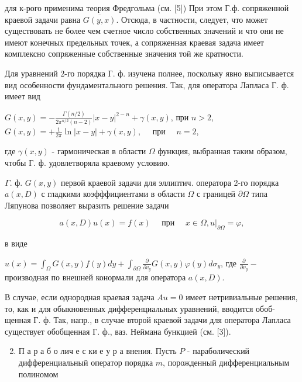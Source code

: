 \documentclass[10pt]{article}
\begin{document}
для к-рого применима теория Фредгольма (см. [5]) При этом Г.ф. сопряженной краевой задачи равна $\overline{G(y, x)}$. Отсюда, в частности, следует, что может существовать не более чем счетное число собственных значений и что они не имеют конечных предельных точек, а сопряженная краевая задача имеет комплексно сопряженные собственные значения той же кратности.



Для уравнений 2-го порядка Г. ф. изучена полнее, поскольку явно выписывается вид особенности фундаментального решения. Так, для оператора Лапласа Г. ф. имеет вид



$G(x, y)=-\frac{\Gamma(n / 2)}{2 \pi^{n / 2}(n-2)}|x-y|^{2-n}+\gamma(x, y)$, при $n>2$, $G(x, y)=+\frac{1}{2 \pi} \ln |x-y|+\gamma(x, y), \quad$ при $\quad n=2$,



где $\gamma(x, y)$ - гармоническая в области $\Omega$ функция, выбранная таким образом, чтобы Г. ф. удовлетворяла краевому условию.



$\Gamma$. ф. $G(x, y)$ первой краевой задачи для эллиптич. оператора 2-го порядка $a(x, D)$ с гладкими коэфффициентами в области $\Omega$ с границей $\partial \Omega$ типа Ляпунова позволяет выразить решение задачи



\[

a(x, D) u(x)=f(x) \quad \text { при } \quad x \in \Omega,\left.u\right|_{\partial \Omega}=\varphi,

\]



в виде



$u(x)=\int_{\Omega} G(x, y) f(y) d y+\int_{\partial \Omega} \frac{\partial}{\partial v_{y}} G(x, y) \varphi(y) d \sigma_{y}$, где $\frac{\partial}{\partial v_{y}}-$ производная по внешней конормали для оператора $a(x, D)$.



В случае, если однородная краевая задача $A u=0$ имеет нетривиальные решения, то, как и для обыкновенных дифференциальных уравнений, вводится обоб- щенная Г. ф. Так, напр., в случае второй краевой задачи для оператора Лапласа существует обобщенная Г. ф., ваз. Неймана бункцией (см. [3]).



\begin{enumerate}

  \setcounter{enumi}{1}

  \item П а р а б о лич е с ки е у р а внения. Пусть $P$ - параболический дифференциальный оператор порядка $m$, порожденный дифференциальным полиномом

\end{enumerate}
\end{document}

